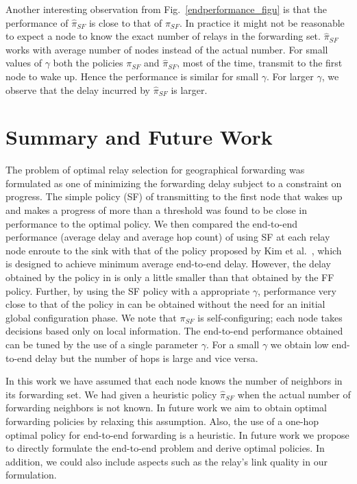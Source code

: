 \documentclass[onecolumn]{IEEEtran}
\begin{document}
Another interesting observation from Fig.~\ref{endperformance_figu} is
that the performance of $\hat{\pi}_{SF}$ is close to that of
$\pi_{SF}$. In practice it might not be reasonable to expect a node to
know the exact number of relays in the forwarding set.
$\hat{\pi}_{SF}$ works with average number of nodes instead of the
actual number. For small values of $\gamma$ both the policies $\pi_{SF}$
and $\hat{\pi}_{SF}$, most of the time, transmit to the first node to
wake up.  Hence the performance is similar for small $\gamma$.  For
larger $\gamma$, we observe that the delay incurred by $\hat{\pi}_{SF}$ is larger.

\section{Summary and Future Work}\label{conclusion}

The problem of optimal relay selection for geographical forwarding was
formulated as one of minimizing the forwarding delay subject to a
constraint on progress.  The simple policy (SF)  of
transmitting to the first node that wakes up and makes a progress of
more than a threshold was found to be close in performance to the
optimal policy.  We then compared the end-to-end performance (average
delay and average hop count) of using SF at each relay node
enroute to the sink with that of the policy proposed by Kim et
al.~\cite{kim-etal09optimal-anycast}, which is designed to achieve
minimum average end-to-end delay. However, the delay obtained by the
 policy in \cite{kim-etal09optimal-anycast}  is only a little smaller than that obtained by the
FF policy.  Further, by using the SF policy with a
appropriate $\gamma$, performance very close to that of the policy in \cite{kim-etal09optimal-anycast}
can be obtained without the need for an initial global configuration
phase.  We note that $\pi_{SF}$ is self-configuring; each node takes
decisions based only on local information. The end-to-end performance
obtained can be tuned by the use of a single parameter $\gamma$.  For
a small $\gamma$ we obtain low end-to-end delay but the number of hops
is large and vice versa.

In this work we have assumed that each node knows the number of
neighbors in its forwarding set. We had given a heuristic policy
$\hat{\pi}_{SF}$ when the actual number of forwarding neighbors is not
known. In future work we aim to obtain optimal forwarding policies by
relaxing this assumption. Also, the use of a one-hop optimal policy
for end-to-end forwarding is  a heuristic. In future work we
propose to directly formulate the end-to-end problem and derive
optimal policies. In addition, we could also include aspects such as
the relay's link quality  in our formulation.
\end{document}
